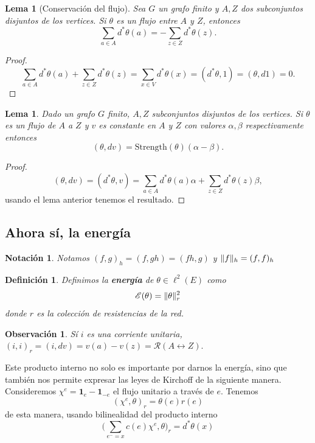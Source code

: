 \documentclass[11pt,a4paper]{article}
\newcommand{\ind}[1]{\mathbf{1}_{#1}}
\DeclarePairedDelimiter{\norm}{\lVert}{\rVert}
\newcommand{\defn}[1]{\textbf{\emph{#1}}}
\numberwithin{equation}{section}
\theoremstyle{LPplain}
\newtheorem{lem}[teo]{Lema}
\theoremstyle{LPdef}
\newtheorem{defi}[teo]{Definición}
\theoremstyle{LPrem}
\newtheorem{obs}[teo]{Observación}
\newtheorem{notacion}[teo]{Notación}
\begin{document}
  \begin{lem}[Conservación del flujo]
    Sea $G$ un grafo finito y $A, Z$ dos subconjuntos disjuntos de los vertices. Si $\theta$
    es un flujo entre $A$ y $Z$, entonces
    $$\sum_{a \in A} d^{*}\theta(a) = - \sum_{z \in Z} d^{*}\theta(z).$$
  \end{lem}

  \begin{proof}
    $$\sum_{a \in A} d^{*}\theta(a) + \sum_{z \in Z} d^{*}\theta(z) = \sum_{x \in V} d^{*}\theta(x) 
    = (d^{*}\theta, 1) = (\theta, d1) = 0.$$
  \end{proof}

\begin{lem}
  Dado un grafo $G$ finito, $A, Z$ subconjuntos disjuntos de los vertices. Si $\theta$ es un flujo
  de $A$ a $Z$ y $v$ es constante en $A$ y $Z$ con valores $\alpha, \beta$ respectivamente entonces
  $$(\theta, dv) = \text{Strength}(\theta)(\alpha - \beta).$$
\end{lem}

\begin{proof}
  $$(\theta, dv) = (d^{*}\theta, v) = \sum_{a\in A} d^{*}\theta(a) \alpha + \sum_{z\in Z}d^{*}\theta(z)\beta,$$
usando el lema anterior tenemos el resultado.
\end{proof}
\subsection{Ahora sí, la energía}

\begin{notacion}
  Notamos $(f, g)_h = (f, gh) = (fh, g)$ y $\norm{f}_h = (f, f)_h$
\end{notacion}

\begin{defi}
  Definimos la \defn{energía} de $\theta \in \ell^2(E)$ como
  $$ \mathscr{E}(\theta) = \norm{\theta}^{2}_r $$
  donde $r$ es la colección de resistencias de la red.
\end{defi}

\begin{obs}
Sí $i$ es una corriente unitaria, $(i, i)_r = (i, dv) = v(a) - v(z) = \mathscr{R}(A \leftrightarrow Z).$
\end{obs}

Este producto interno no solo es importante por darnos la energía, sino que también nos 
permite expresar las leyes de Kirchoff de la siguiente manera. Consideremos 
$\chi^{e} = \ind{e} - \ind{-e}$ el flujo unitario a través de $e$. Tenemos 
$$(\chi^{e}, \theta)_r = \theta(e)r(e)$$
de esta manera, usando bilinealidad del producto interno
$$\Big(\sum_{e^{-} = x} c(e)\chi^{e}, \theta\Big)_r = d^{*}\theta(x)$$
\end{document}
